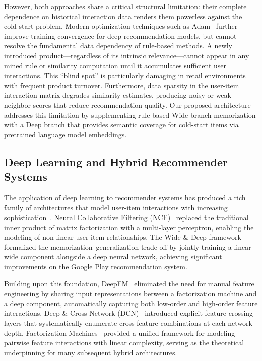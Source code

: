 \documentclass[10pt,conference]{IEEEtran}
\begin{document}
However, both approaches share a critical structural limitation: their complete dependence on historical interaction data renders them powerless against the cold-start problem. Modern optimization techniques such as Adam~\cite{kingma2015adam} further improve training convergence for deep recommendation models, but cannot resolve the fundamental data dependency of rule-based methods. A newly introduced product---regardless of its intrinsic relevance---cannot appear in any mined rule or similarity computation until it accumulates sufficient user interactions. This ``blind spot'' is particularly damaging in retail environments with frequent product turnover. Furthermore, data sparsity in the user-item interaction matrix degrades similarity estimates, producing noisy or weak neighbor scores that reduce recommendation quality. Our proposed architecture addresses this limitation by supplementing rule-based Wide branch memorization with a Deep branch that provides semantic coverage for cold-start items via pretrained language model embeddings.

\subsection{Deep Learning and Hybrid Recommender Systems}
\label{subsec:deep_hybrid}

The application of deep learning to recommender systems has produced a rich family of architectures that model user-item interactions with increasing sophistication~\cite{zhang2019deep}. Neural Collaborative Filtering (NCF)~\cite{he2017neural} replaced the traditional inner product of matrix factorization with a multi-layer perceptron, enabling the modeling of non-linear user-item relationships. The Wide \& Deep framework~\cite{cheng2016wide} formalized the memorization--generalization trade-off by jointly training a linear wide component alongside a deep neural network, achieving significant improvements on the Google Play recommendation system.

Building upon this foundation, DeepFM~\cite{guo2017deepfm} eliminated the need for manual feature engineering by sharing input representations between a factorization machine and a deep component, automatically capturing both low-order and high-order feature interactions. Deep \& Cross Network (DCN)~\cite{wang2017deep} introduced explicit feature crossing layers that systematically enumerate cross-feature combinations at each network depth. Factorization Machines~\cite{rendle2010factorization} provided a unified framework for modeling pairwise feature interactions with linear complexity, serving as the theoretical underpinning for many subsequent hybrid architectures.
\end{document}
